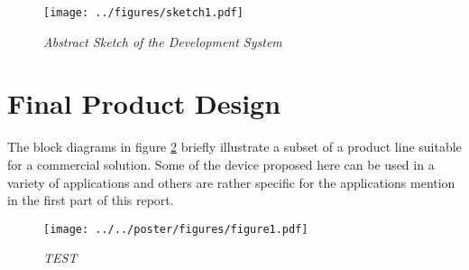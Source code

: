 \begin{figure}
\centering
\texttt{[image: ../figures/sketch1.pdf]}
\caption{\emph{Abstract Sketch of the Development System}} \label{fig:sketch1}
\end{figure}


\pagebreak
\section{Final Product Design}

  The block diagrams in figure \ref{fig:products} briefly illustrate
 a subset of a product line suitable for a commercial solution. Some
 of the device proposed here can be used in a variety of applications
 and others are rather specific for the applications mention in the
 first part of this report.

\begin{figure}
\centering
\texttt{[image: ../../poster/figures/figure1.pdf]}
\caption{\emph{TEST}} \label{fig:products}
\end{figure}
